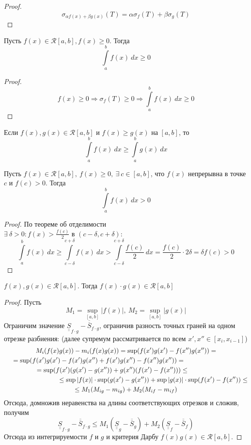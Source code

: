 \begin{proof}
    \[\sigma_{\alpha f(x)+\beta g(x)}(T)=\alpha\sigma_f(T)+\beta\sigma_g(T)\]
\end{proof}
\begin{numtheorem}
    Пусть $f(x)\in \mathcal{R}[a,b], f(x)\geq 0$. Тогда
    \[\int\limits_{a}^{b}f(x)\ dx\geq 0\]
\end{numtheorem}
\begin{proof}
    \[f(x)\geq 0 \Rightarrow \sigma_f(T)\geq 0 \Rightarrow \int\limits_{a}^{b} f(x)\ dx \geq 0\]
\end{proof} 
\begin{consequense}
    Если $f(x), g(x)\in \mathcal{R}[a,b]$ и $f(x)\geq g(x)$ на $[a,b]$, то 
    \[\int\limits_{a}^{b}f(x)\ dx\geq \int\limits_{a}^{b}g(x)\ dx\]
\end{consequense}
\begin{numtheorem}
    Пусть $f(x)\in \mathcal{R}[a,b],\ f(x)\geq 0,\ \exists\ c\in[a,b]$, что $f(x)$ непрерывна в точке $c$ и $f(c)>0$. Тогда 
    \[\int\limits_{a}^{b}f(x)\ dx>0\]
\end{numtheorem}
\begin{proof}
    По теореме об отделимости\\
    $\exists\ \delta>0: f(x)>\frac{f(c)}{2}$ в $(c-\delta, c+\delta):$
    \[\int\limits_{a}^{b}f(x)\ dx\geq \int\limits_{c-\delta}^{c+\delta}f(x)\ dx>\int\limits_{c-\delta}^{c+\delta}\frac{f(c)}{2}\ dx=\frac{f(c)}{2}\cdot 2\delta=\delta f(c)>0\]
\end{proof}
\begin{numtheorem}
    $f(x), g(x)\in \mathcal{R}[a,b]$. Тогда $f(x)\cdot g(x)\in \mathcal{R}[a,b]$
\end{numtheorem}
\begin{proof} Пусть 
    \[M_1=\sup\limits_{[a,b]}|f(x)|,\ M_2=\sup\limits_{[a,b]}|g(x)|\]
    Ограничим значение $\underline{\underline{S}}_{f\cdot g}-\overline{\overline{S}}_{f\cdot g}$, ограничив разность точных граней на одном отрезке разбиения: (далее супремум рассматривается по всем $x',x''\in[x_i,x_{i-1}]$)
    \begin{multline*}
        M_i(f(x)g(x))-m_i(f(x)g(x))=\sup(f(x')g(x')-f(x'')g(x''))=\\
        =\sup(f(x')g(x')-f(x')g(x'')+f(x')g(x'')-f(x'')g(x''))=\tab[3cm]\\
        =\sup(f(x')(g(x')-g(x''))+g(x'')(f(x')-f(x'')))\leq\tab[1.5cm]\\
        \tab[3cm]\leq \sup|f(x)|\cdot \sup(g(x')-g(x''))+\sup|g(x)|\cdot \sup(f(x')-f(x''))\leq \\
        \leq M_1 (M_{ig}-m_{ig})+M_2(M_{if}-m_{if})
    \end{multline*}
    Отсюда, домножив неравенства на длины соответствующих отрезков и сложив, получим
    \begin{equation*}
        \underline{\underline{S}}_{f\cdot g}-\overline{\overline{S}}_{f\cdot g}\leq M_1(\underline{\underline{S}}_g-\overline{\overline{S}}_g)+M_2(\underline{\underline{S}}_f-\overline{\overline{S}}_f)
    \end{equation*}
    Отсюда из интегрируемости $f$ и $g$ и критерия Дарбу $f(x)g(x) \in \mathcal{R}[a, b]$.  
\end{proof}